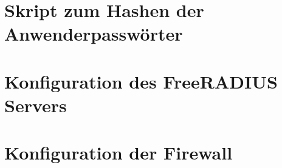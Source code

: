 \documentclass[11pt,a4paper,titlepage=firstiscover]{scrartcl} %
\begin{document}
\section{Skript zum Hashen der Anwenderpasswörter}\label{sec:SkriptB}
\newpage
\section{Konfiguration des FreeRADIUS Servers}\label{sec:RADIUS-Konfig}
\newpage
\section{Konfiguration der Firewall}\label{sec:Firewall-Konfig}

%
%
\end{document}
